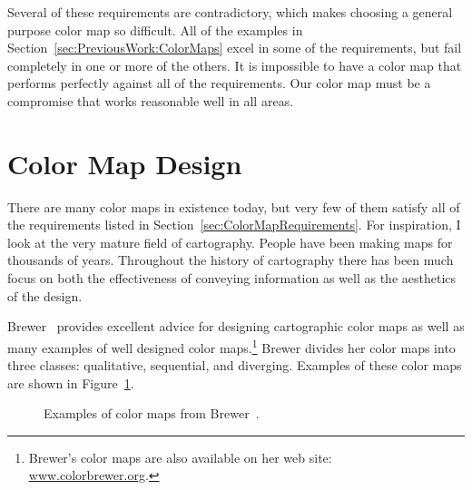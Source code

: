 \documentclass{vgtc}                          %
\newcommand{\scite}[1]{~\cite{#1}}
\begin{document}
Several of these requirements are contradictory, which makes choosing a
general purpose color map so difficult.  All of the examples in
Section~\ref{sec:PreviousWork:ColorMaps} excel in some of the requirements,
but fail completely in one or more of the others.  It is impossible to have
a color map that performs perfectly against all of the requirements.  Our color
map must be a compromise that works reasonable well in all areas.


\section{Color Map Design}
\label{sec:ColorMapDesign}

There are many color maps in existence today, but very few of them satisfy
all of the requirements listed in Section~\ref{sec:ColorMapRequirements}.
For inspiration, I look at the very mature field of cartography.  People
have been making maps for thousands of years.  Throughout the history of
cartography there has been much focus on both the effectiveness of
conveying information as well as the aesthetics of the design.

Brewer\scite{Brewer05} provides excellent advice for designing cartographic
color maps as well as many examples of well designed color
maps.\footnote{Brewer's color maps are also available on her web site:
  \href{http://www.colorbrewer.org}{www.colorbrewer.org}.} Brewer divides
her color maps into three classes: qualitative, sequential, and diverging.
Examples of these color maps are shown in Figure~\ref{fig:BrewerExamples}.

\begin{figure}
  \centering
  \caption{Examples of color maps from Brewer\scite{Brewer05}.}
  \label{fig:BrewerExamples}
\end{figure}
\end{document}
